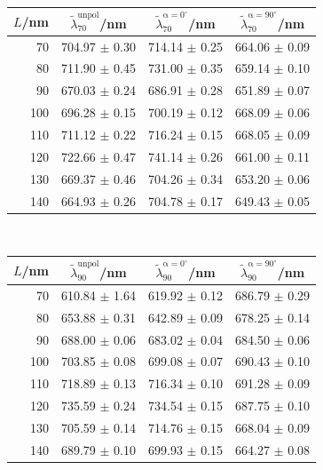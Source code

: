 \begin{center}
    \captionsetup{type = table}
    \begin{tabular}{r | c c c}
        $L$/nm & $\tilde{\lambda}^\mathrm{unpol}_{70}$/nm & $\tilde{\lambda}^\mathrm{\alpha = 0^\circ}_{70}$/nm & $\tilde{\lambda}^\mathrm{\alpha = 90^\circ}_{70}$/nm \\\hline
        70  & 704.97 $\pm$ 0.30 & 714.14 $\pm$ 0.25 & 664.06 $\pm$ 0.09 \\
        80  & 711.90 $\pm$ 0.45 & 731.00 $\pm$ 0.35 & 659.14 $\pm$ 0.10 \\
        90  & 670.03 $\pm$ 0.24 & 686.91 $\pm$ 0.28 & 651.89 $\pm$ 0.07 \\
        100 & 696.28 $\pm$ 0.15 & 700.19 $\pm$ 0.12 & 668.09 $\pm$ 0.06 \\
        110 & 711.12 $\pm$ 0.22 & 716.24 $\pm$ 0.15 & 668.05 $\pm$ 0.09 \\
        120 & 722.66 $\pm$ 0.47 & 741.14 $\pm$ 0.26 & 661.00 $\pm$ 0.11 \\
        130 & 669.37 $\pm$ 0.46 & 704.26 $\pm$ 0.34 & 653.20 $\pm$ 0.06 \\
        140 & 664.93 $\pm$ 0.26 & 704.78 $\pm$ 0.17 & 649.43 $\pm$ 0.05 \\
    \end{tabular}\\[0.5cm]
    \begin{tabular}{r | c c c}
        $L$/nm & $\tilde{\lambda}^\mathrm{unpol}_{90}$/nm & $\tilde{\lambda}^\mathrm{\alpha = 0^\circ}_{90}$/nm & $\tilde{\lambda}^\mathrm{\alpha = 90^\circ}_{90}$/nm \\\hline
        70  & 610.84 $\pm$ 1.64 & 619.92 $\pm$ 0.12 & 686.79 $\pm$ 0.29 \\
        80  & 653.88 $\pm$ 0.31 & 642.89 $\pm$ 0.09 & 678.25 $\pm$ 0.14 \\
        90  & 688.00 $\pm$ 0.06 & 683.02 $\pm$ 0.04 & 684.50 $\pm$ 0.06 \\
        100 & 703.85 $\pm$ 0.08 & 699.08 $\pm$ 0.07 & 690.43 $\pm$ 0.10 \\
        110 & 718.89 $\pm$ 0.13 & 716.34 $\pm$ 0.10 & 691.28 $\pm$ 0.09 \\
        120 & 735.59 $\pm$ 0.24 & 734.54 $\pm$ 0.15 & 687.75 $\pm$ 0.10 \\
        130 & 705.59 $\pm$ 0.14 & 714.76 $\pm$ 0.15 & 668.04 $\pm$ 0.09 \\
        140 & 689.79 $\pm$ 0.10 & 699.93 $\pm$ 0.15 & 664.27 $\pm$ 0.08 \\
    \end{tabular}
    \label{tab:nanorods}
\end{center}